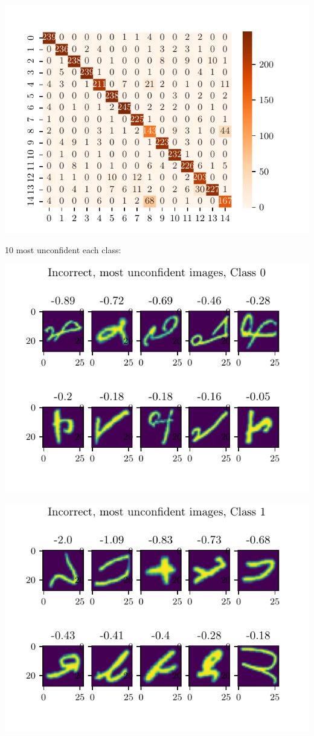 \documentclass[11pt]{article}
\begin{document}
\includegraphics{figures/2d_confusion_matrix.pdf}

10 most unconfident each class:

\includegraphics{figures/2d_unconfident_imgs_class_0.pdf}

\includegraphics{figures/2d_unconfident_imgs_class_1.pdf}
\end{document}
